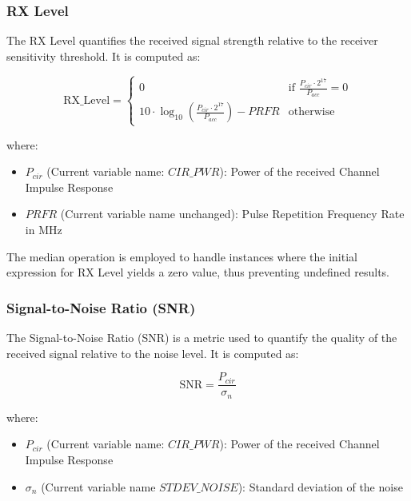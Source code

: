 \documentclass[
	article, %
	11pt, %
	draft, %
]{CSUniSchoolLabReport}
\begin{document}
\subsubsection{RX Level}\label{rx_level}

The RX Level quantifies the received signal strength relative to the receiver sensitivity threshold. It is computed as:

\begin{equation}
  \text{RX\_Level} =
  \begin{cases}
    0 & \text{if } \frac{P_{cir} \cdot 2^{17}}{P_{acc}} = 0 \\
    10 \cdot \log_{10} \left( \frac{P_{cir} \cdot 2^{17}}{P_{acc}} \right) - PRFR & \text{otherwise}
  \end{cases}
\end{equation}

where:

\begin{itemize}
  \item $P_{cir}$ (Current variable name: $CIR\_PWR$): Power of the received Channel Impulse Response
  \item $PRFR$ (Current variable name unchanged): Pulse Repetition Frequency Rate in MHz
\end{itemize}

The median operation is employed to handle instances where the initial expression for RX Level yields a zero value, thus preventing undefined results.

\subsubsection{Signal-to-Noise Ratio (SNR)}\label{snr}

The Signal-to-Noise Ratio (SNR) is a metric used to quantify the quality of the received signal relative to the noise level. It is computed as:

\begin{equation}
  \text{SNR} = \frac{P_{cir}}{\sigma_n}
\end{equation}

where:

\begin{itemize}
  \item $P_{cir}$ (Current variable name: $CIR\_PWR$): Power of the received Channel Impulse Response
  \item $\sigma_n$ (Current variable name $STDEV\_NOISE$): Standard deviation of the noise
\end{itemize}
\end{document}
